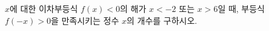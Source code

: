 \hspace*{2mm}\begin{minipage}[t]{\dimexpr\linewidth-2mm\relax}\vspace{0pt}
$x$에 대한 이차부등식 $f(x)<0$의 해가 $x<-2$ 또는 $x>6$일 때, 부등식 $f(-x)>0$을 만족시키는 정수 $x$의 개수를 구하시오.\end{minipage}
